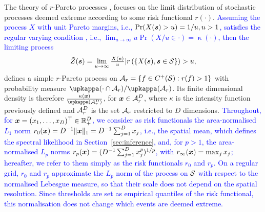 \documentclass[12pt]{article}
\newcommand{\PZ}{\textcolor{blue}}
\begin{document}
The theory of $r$-Pareto processes \citep{Dombry.Ribatet:2015, deFondeville.Davison:2022}, focuses on the limit distribution of stochastic processes deemed extreme according to some risk functional $r(\cdot)$.
\PZ{Assuming the process $X$ with unit Pareto margins, i.e., ${\rm Pr}(X({\boldsymbol{s}})>u)=1/u,u>1$, satisfies the regular varying condition \citep[see][]{Dombry.Ribatet:2015}, i.e., $\lim_{u\to\infty}u\Pr(X/u \in \cdot)=\upkappa(\cdot)$,
then the limiting process}
\begin{align}
\label{eq:rpp}    
\tilde{Z}({\boldsymbol{s}}) = \lim_{u\rightarrow \infty} {\textstyle{X({\boldsymbol{s}})\over u}}  \vert r\left(\{X({\boldsymbol{s}}),{\boldsymbol{s}}\in{\mathcal{S}}\} \right) >u,
\end{align}
%
defines a simple $r$-Pareto process on ${\mathcal A}_r = \left\{ f \in C^+({\mathcal{S}}): r(f) > 1\right\}$ with probability measure $\upkappa(\cdot \cap \calA_r)/ \upkappa(\calA_r)$. 
Its finite dimensional density is therefore
%
$\frac{\kappa(\bx)}{\upkappa(\calA_r^D)}$, for ${\boldsymbol{x}} \in {\mathcal A}_r^D$,
%
where $\kappa$ is the intensity function previously defined and ${\mathcal A}_r^D$ is the set ${\mathcal A}_r$ restricted to $D$ dimensions.
\PZ{Throughout, for ${\boldsymbol{x}}=(x_1,\dots,x_D)^\top\in{\mathbb R}^D_+$, we consider as risk functionals the area-normalised $L_1$ norm $r_0({\boldsymbol{x}})=D^{-1}\|{\boldsymbol{x}}\|_1=D^{-1}\sum_{j=1}^D x_j$, i.e., the spatial mean, which defines the spectral likelihood in Section~\ref{sec:inference}, and, for $p>1$, the area-normalised $L_p$ norms $r_p({\boldsymbol{x}})=(D^{-1}\sum_{j=1}^D x_j^p)^{1/p}$, with $r_\infty({\boldsymbol{x}})=\max_j x_j$; hereafter, we refer to them simply as the risk functionals $r_0$ and $r_p$. On a regular grid, $r_0$ and $r_p$ approximate the $L_p$ norm of the process on ${\mathcal{S}}$ with respect to the normalised Lebesgue measure, so that their scale does not depend on the spatial resolution. Since thresholds are set as empirical quantiles of the risk functional, this normalisation does not change which events are deemed extreme.}
\end{document}
